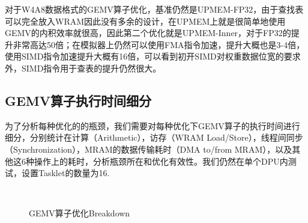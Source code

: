 对于W4A8数据格式的GEMV算子优化，基准仍然是UPMEM-FP32，由于查找表可以完全放入WRAM因此没有多余的设计，在UPMEM上就是很简单地使用GEMV的内积效率就很高，因此第二个优化就是UPMEM-Inner，对于FP32的提升非常高达50倍；在模拟器上仍然可以使用FMA指令加速，提升大概也是3-4倍，使用SIMD指令加速提升大概有16倍，可以看到初开SIMD对权重数据位宽的要求外，SIMD指令用于查表的提升仍然很大。

\subsection{GEMV算子执行时间细分}
为了分析每种优化的的瓶颈，我们需要对每种优化下GEMV算子的执行时间进行细分，分别统计在计算（Arithmetic），访存（WRAM Load/Store），线程间同步（Synchronization），MRAM的数据传输耗时（DMA to/from MRAM），以及其他这6种操作上的耗时，分析瓶颈所在和优化有效性。我们仍然在单个DPU内测试，设置Tasklet的数量为16.

\begin{figure}[htbp]
	\centering
    \\
    \label{GEMVTime} %
	\caption{GEMV算子优化Breakdown}
\end{figure}

